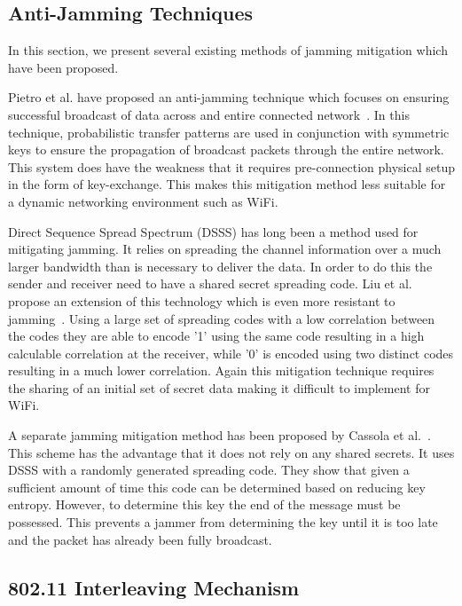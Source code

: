 \documentclass[sigconf]{acmart}
\begin{document}
\subsection{Anti-Jamming Techniques}
\label{sec:anti_jamming}

In this section, we present several existing methods of jamming mitigation which have been proposed.

Pietro et al. have proposed an anti-jamming technique which focuses on ensuring successful broadcast of data across and entire connected network~\cite{di2015freedom}. In this technique, probabilistic transfer patterns are used in conjunction with symmetric keys to ensure the propagation of broadcast packets through the entire network. This system does have the weakness that it requires pre-connection physical setup in the form of key-exchange. This makes this mitigation method less suitable for a dynamic networking environment such as WiFi.

Direct Sequence Spread Spectrum (DSSS) has long been a method used for mitigating jamming. It relies on spreading the channel information over a much larger bandwidth than is necessary to deliver the data. In order to do this the sender and receiver need to have a shared secret spreading code. Liu et al. propose an extension of this technology which is even more resistant to jamming~\cite{liu2010randomized}. Using a large set of spreading codes with a low correlation between the codes they are able to encode '1' using the same code resulting in a high calculable correlation at the receiver, while '0' is encoded using two distinct codes resulting in a much lower correlation. Again this mitigation technique requires the sharing of an initial set of secret data making it difficult to implement for WiFi.

A separate jamming mitigation method has been proposed by Cassola et al.~\cite{cassola2012efficient}. This scheme has the advantage that it does not rely on any shared secrets. It uses DSSS with a randomly generated spreading code. They show that given a sufficient amount of time this code can be determined based on reducing key entropy. However, to determine this key the end of the message must be possessed. This prevents a jammer from determining the key until it is too late and the packet has already been fully broadcast. 

\subsection{802.11 Interleaving Mechanism}
\label{sub:interleavingMech}
\end{document}
